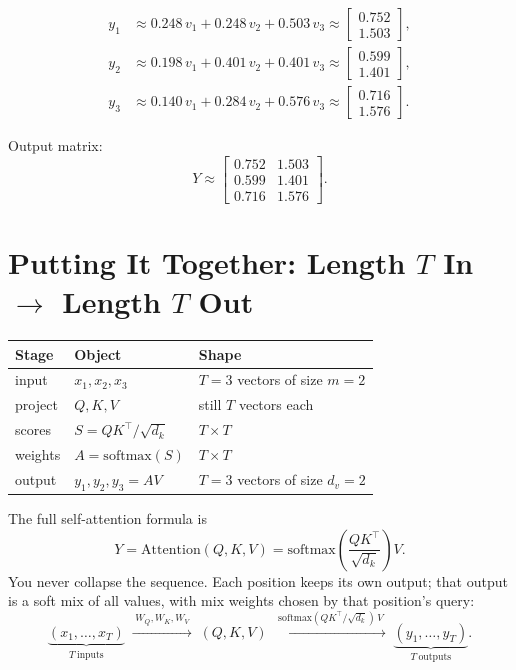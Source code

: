 \documentclass[11pt]{article}
\begin{document}
\begin{align*}
  y_1 &\approx 0.248\,v_1 + 0.248\,v_2 + 0.503\,v_3
       \approx \begin{bmatrix}0.752\\1.503\end{bmatrix}, \\
  y_2 &\approx 0.198\,v_1 + 0.401\,v_2 + 0.401\,v_3
       \approx \begin{bmatrix}0.599\\1.401\end{bmatrix}, \\
  y_3 &\approx 0.140\,v_1 + 0.284\,v_2 + 0.576\,v_3
       \approx \begin{bmatrix}0.716\\1.576\end{bmatrix}.
\end{align*}

Output matrix:
\[
  Y \approx
  \begin{bmatrix}
    0.752 & 1.503 \\
    0.599 & 1.401 \\
    0.716 & 1.576
  \end{bmatrix}.
\]

\section{Putting It Together: Length \(T\) In \(\to\) Length \(T\) Out}

\begin{center}
\begin{tabular}{@{}lll@{}}
\toprule
Stage & Object & Shape \\
\midrule
input     & \(x_1,x_2,x_3\) & \(T=3\) vectors of size \(m=2\) \\
project   & \(Q,K,V\) & still \(T\) vectors each \\
scores    & \(S = QK^\top / \sqrt{d_k}\) & \(T\times T\) \\
weights   & \(A = \mathrm{softmax}(S)\) & \(T\times T\) \\
output    & \(y_1,y_2,y_3 = AV\) & \(T=3\) vectors of size \(d_v=2\) \\
\bottomrule
\end{tabular}
\end{center}

The full self-attention formula is
\[
  \boxed{
    Y
    =
    \mathrm{Attention}(Q,K,V)
    =
    \mathrm{softmax}\!\left(\frac{QK^\top}{\sqrt{d_k}}\right)V.
  }
\]
You never collapse the sequence. Each position keeps its own output; that
output is a soft mix of all values, with mix weights chosen by that
position's query:
\[
  \underbrace{(x_1,\ldots,x_T)}_{T\ \text{inputs}}
  \;\xrightarrow{\;W_Q,W_K,W_V\;}\;
  (Q,K,V)
  \;\xrightarrow{\;\mathrm{softmax}(QK^\top/\sqrt{d_k})\,V\;}\;
  \underbrace{(y_1,\ldots,y_T)}_{T\ \text{outputs}}.
\]
\end{document}
